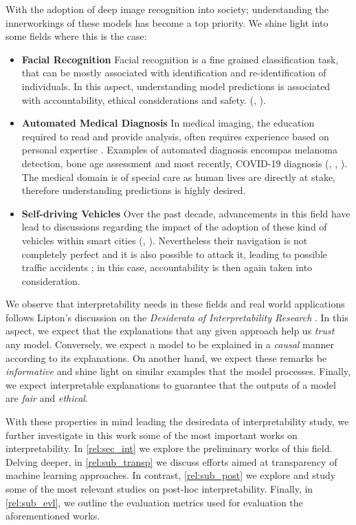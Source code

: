 \noindent With the adoption of deep image recognition into society; understanding the 
innerworkings of these models has become a top priority. We shine light into some fields where 
this is the case:
\begin{itemize}
    \item \textbf{Facial Recognition} Facial recognition is a fine grained classification task, 
    that can be mostly associated with identification and re-identification of individuals. 
    In this aspect, understanding model predictions is associated with accountability, ethical 
    considerations and safety.
    (\cite{selinger2020inconsentability}, \cite{andrejevic2020facial}).
    \item \textbf{Automated Medical Diagnosis} In medical imaging, the education 
    required to read and provide analysis, often requires experience based 
    on personal expertise \autocite{nakashima2013visual}. Examples of automated diagnosis encompas 
    melanoma detection, bone age assessment and most recently, COVID-19 diagnosis (\cite{yu2016automated}, 
    \cite{BoNet2019hand}, \cite{huang2021artificial}). The medical domain is of special care 
    as human lives are directly at stake, therefore understanding predictions is highly desired.
    \item \textbf{Self-driving Vehicles} Over the past decade, advancements in this field have lead to 
    discussions regarding the impact of the adoption of these kind of vehicles within smart cities  
    (\cite{duarte2018impact}, \cite{millard2018pedestrians}). Nevertheless their 
    navigation is not completely perfect and it is also possible to attack it, leading to possible 
    traffic accidents \autocite{dixit2016autonomous}; in this case, accountability is then again 
    taken into consideration.
\end{itemize}

We observe that interpretability needs in these fields and real world applications follows 
Lipton's discussion on the \textit{Desiderata of Interpretability Research} 
\autocite{mythos_interp}. In this aspect, we expect that the explanations that any given 
approach help us \emph{trust} any model. Conversely, we expect a model to be explained in a 
\emph{causal} manner according to its explanations. On another hand, 
we expect these remarks be \emph{informative} and shine light on similar examples that the 
model processes. Finally, we expect interpretable explanations to guarantee that the outputs 
of a model are \emph{fair} and \emph{ethical}.

With these properties in mind leading the desiredata of interpretability study, we further 
investigate in this work some of the most important works on interpretability. In 
\autoref{rel:sec_int} we explore the preliminary works of this field. Delving deeper, in 
\autoref{rel:sub_transp} we discuss efforts aimed at transparency of machine learning approaches. 
In contrast, \autoref{rel:sub_post} we explore and study 
some of the most relevant studies on post-hoc interpretability. Finally, in \autoref{rel:sub_evl}, 
we outline the evaluation metrics used for evaluation the aforementioned works.

\newpage

\newpage
